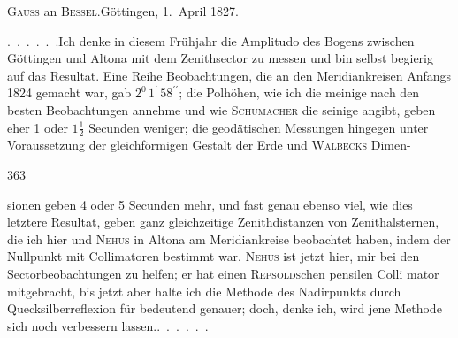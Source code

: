 \begin{center}
\textsc{Gauss} an \textsc{Bessel}.\quad Göttingen, 1.~April 1827.
\end{center}

\par\noindent\hspace*{\parindent}.\ .\ .\ .\ .\ .\quad Ich denke in diesem Frühjahr die Amplitudo des Bogens zwischen
Göttingen und Altona mit dem Zenithsector zu messen und bin selbst begierig
auf das Resultat. Eine Reihe Beobachtungen, die an den Meridiankreisen Anfangs
1824 gemacht war, gab \(2^{0}\,1^{\prime}\,58^{\prime\prime}\); die Polhöhen, wie ich die meinige nach den
besten Beobachtungen annehme und wie \textsc{Schumacher} die seinige angibt, geben
eher 1 oder \(1\frac{1}{2}\) Secunden weniger; die geodätischen Messungen hingegen
unter Voraussetzung der gleichförmigen Gestalt der Erde und \textsc{Walbecks} Dimen-
\par\clearpage
{}\hfill363\par\medskip
\noindent sionen geben 4 oder 5 Secunden mehr, und fast genau ebenso viel, wie dies
letztere Resultat, geben ganz gleichzeitige Zenithdistanzen von Zenithalsternen,
die ich hier und \textsc{Nehus} in Altona am Meridiankreise beobachtet haben, indem
der Nullpunkt mit Collimatoren bestimmt war. \textsc{Nehus} ist jetzt hier, mir bei
den Sectorbeobachtungen zu helfen; er hat einen \textsc{Repsolds}chen pensilen Colli\-%
mator mitgebracht, bis jetzt aber halte ich die Methode des Nadirpunkts durch
Quecksilberreflexion für bedeutend genauer; doch, denke ich, wird jene Methode
sich noch verbessern lassen.\quad.\ .\ .\ .\ .\ .
